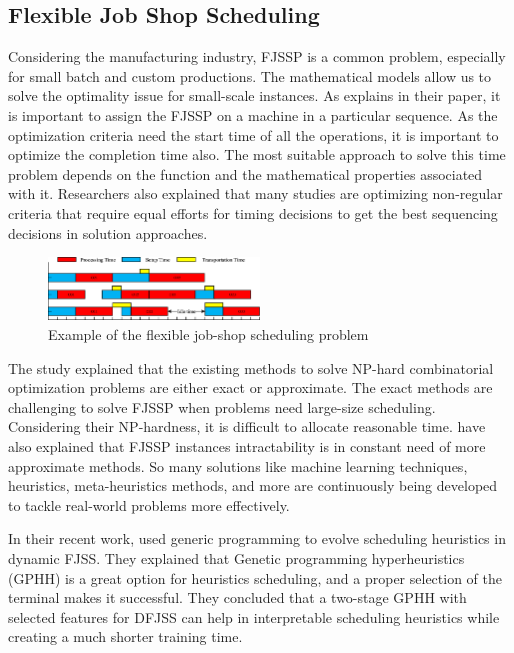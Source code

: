 \subsection{Flexible Job Shop Scheduling}
Considering the manufacturing industry, FJSSP is a common problem, especially for small batch and custom productions. The mathematical models allow us to solve the optimality issue for small-scale instances. As \cite{dauzere2024flexible} explains in their paper, it is important to assign the FJSSP on a machine in a particular sequence. As the optimization criteria need the start time of all the operations, it is important to optimize the completion time also. The most suitable approach to solve this time problem depends on the function and the mathematical properties associated with it. Researchers also explained that many studies are optimizing non-regular criteria that require equal efforts for timing decisions to get the best sequencing decisions in solution approaches. 
\vspace{1em}

\begin{figure}[ht]
  \centering
  \includegraphics[width=0.5\textwidth]{FJSSP.png} 
  \caption{Example of the flexible job-shop scheduling problem \cite{zhang2022novel}}
  \label{fig:image2}
\end{figure}

\vspace{1em}
The study \cite{lei2022multi} explained that the existing methods to solve NP-hard combinatorial optimization problems are either exact or approximate. The exact methods are challenging to solve FJSSP when problems need large-size scheduling. Considering their NP-hardness, it is difficult to allocate reasonable time. \cite{lei2022multi} have also explained that FJSSP instances intractability is in constant need of more approximate methods. So many solutions like machine learning techniques, heuristics, meta-heuristics methods, and more are continuously being developed to tackle real-world problems more effectively. 

\vspace{1em}
In their recent work, \cite{zhang2020evolving} used generic programming to evolve scheduling heuristics in dynamic FJSS. They explained that Genetic programming hyperheuristics (GPHH) is a great option for heuristics scheduling, and a proper selection of the terminal makes it successful. They concluded that a two-stage GPHH with selected features for DFJSS can help in interpretable scheduling heuristics while creating a much shorter training time.
